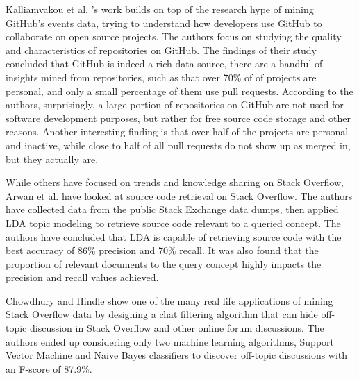         Kalliamvakou et al. \cite{kalliamvakou2014promises}'s work builds on top of the research hype of mining GitHub's events data, trying to understand how developers use GitHub to collaborate on open source projects. The authors focus on studying the quality and characteristics of repositories on GitHub. The findings of their study concluded that GitHub is indeed a rich data source, there are a handful of insights mined from repositories, such as that over 70\% of of projects are personal, and only a small percentage of them use pull requests. According to the authors, surprisingly, a large portion of repositories on GitHub are not used for software development purposes, but rather for free source code storage and other reasons. Another interesting finding is that over half of the projects are personal and inactive, while close to half of all pull requests do not show up as merged in, but they actually are.
        
        While others have focused on trends and knowledge sharing on Stack Overflow, Arwan et al. \cite{arwan2015source} have looked at source code retrieval on Stack Overflow. The authors have collected data from the public Stack Exchange data dumps, then applied LDA topic modeling to retrieve source code relevant to a queried concept. The authors have concluded that LDA is capable of retrieving source code with the best accuracy of 86\% precision and 70\% recall. It was also found that the proportion of relevant documents to the query concept highly impacts the precision and recall values achieved.
        
        Chowdhury and Hindle \cite{chowdhury2015mining} show one of the many real life applications of mining Stack Overflow data by designing a chat filtering algorithm that can hide off-topic discussion in Stack Overflow and other online forum discussions. The authors ended up considering only two machine learning algorithms, Support Vector Machine and Naive Bayes classifiers to discover off-topic discussions with an F-score of 87.9\%.
        
